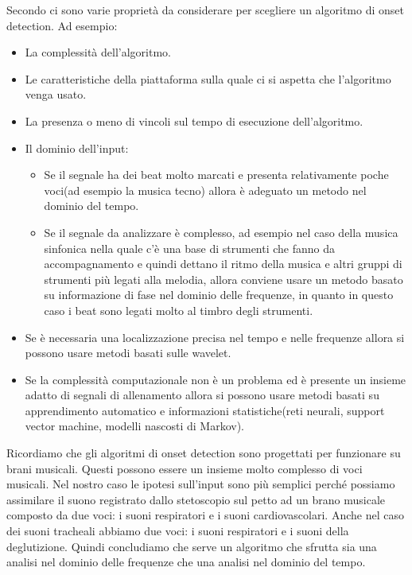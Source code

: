 Secondo \cite{Pekonen} ci sono varie propriet\`a da considerare per scegliere un algoritmo di onset detection. 
Ad esempio: 
\begin{itemize}
  \item
    La complessit\`a dell'algoritmo.
  \item
    Le caratteristiche della piattaforma sulla quale ci si aspetta che l'algoritmo venga usato.
  \item
    La presenza o meno di vincoli sul tempo di esecuzione dell'algoritmo. 
  \item
    Il dominio dell'input: 
    \begin{itemize}
      \item
	Se il segnale ha dei beat molto marcati e presenta relativamente poche voci(ad esempio la musica tecno) allora \`e adeguato un metodo nel dominio del tempo.
      \item
	Se il segnale da analizzare \`e complesso, ad esempio nel caso della musica sinfonica nella quale c'\`e una base di strumenti che fanno da accompagnamento e quindi dettano il ritmo della musica e altri gruppi di strumenti pi\`u legati alla melodia, allora conviene usare un metodo basato su informazione di fase nel dominio delle frequenze, in quanto in questo caso i beat sono legati molto al timbro degli strumenti.
    \end{itemize}
  \item
    Se \`e necessaria una localizzazione precisa nel tempo e nelle frequenze allora si possono usare metodi basati sulle wavelet. 
  \item
    Se la complessit\`a computazionale non \`e un problema ed \`e presente un insieme adatto di segnali di allenamento allora si possono usare metodi basati su apprendimento automatico e informazioni statistiche(reti neurali, support vector machine, modelli nascosti di Markov).
\end{itemize}

Ricordiamo che gli algoritmi di onset detection sono progettati per funzionare su brani musicali. 
Questi possono essere un insieme molto complesso di voci musicali. 
Nel nostro caso le ipotesi sull'input sono pi\`u semplici perch\'e possiamo assimilare il suono registrato dallo stetoscopio sul petto ad un brano musicale composto da due voci: i suoni respiratori e i suoni cardiovascolari. 
Anche nel caso dei suoni tracheali abbiamo due voci: i suoni respiratori e i suoni della deglutizione.
Quindi concludiamo che serve un algoritmo che sfrutta sia una analisi nel dominio delle frequenze che una analisi nel dominio del tempo.



